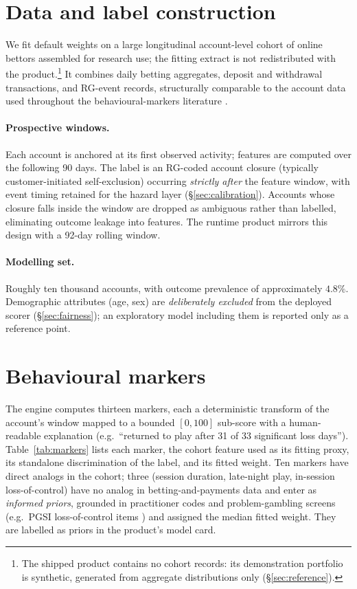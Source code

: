 \documentclass[11pt]{article}
\begin{document}
\section{Data and label construction}\label{sec:data}

We fit default weights on a large longitudinal account-level cohort of online bettors
assembled for research use; the fitting extract is not redistributed with the
product.\footnote{The shipped product contains no cohort records: its demonstration
portfolio is synthetic, generated from aggregate distributions only
(\S\ref{sec:reference}).} It combines daily betting aggregates, deposit and withdrawal
transactions, and RG-event records, structurally comparable to the account data used
throughout the behavioural-markers literature \citep{labrie2007,braverman2012}.

\paragraph{Prospective windows.} Each account is anchored at its first observed
activity; features are computed over the following 90 days. The label is an RG-coded
account closure (typically customer-initiated self-exclusion)
occurring \emph{strictly after} the feature window, with event timing retained for
the hazard layer (\S\ref{sec:calibration}). Accounts whose closure falls inside
the window are dropped as ambiguous rather than labelled, eliminating outcome leakage
into features. The runtime product mirrors this design with a 92-day rolling window.

\paragraph{Modelling set.} Roughly ten thousand accounts, with outcome prevalence of
approximately $4.8\%$. Demographic attributes (age, sex) are \emph{deliberately excluded} from the
deployed scorer (\S\ref{sec:fairness}); an exploratory model including them is reported
only as a reference point.

\section{Behavioural markers}\label{sec:markers}

The engine computes thirteen markers, each a deterministic transform of the account's
window mapped to a bounded $[0,100]$ sub-score with a human-readable explanation
(e.g.\ ``returned to play after 31 of 33 significant loss days''). Table~\ref{tab:markers}
lists each marker, the cohort feature used as its fitting proxy, its standalone
discrimination of the label, and its fitted weight. Ten markers have direct analogs in
the cohort; three (session duration, late-night play, in-session loss-of-control) have
no analog in betting-and-payments data and enter as \emph{informed priors}, grounded in
practitioner codes and problem-gambling screens (e.g.\ PGSI loss-of-control items
\citep{ferris2001}) and assigned the median fitted weight. They are labelled as priors
in the product's model card.
\end{document}
